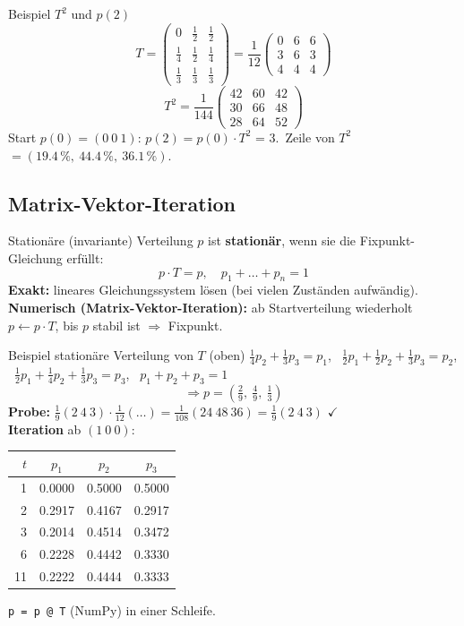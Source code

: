 \documentclass[a4paper, fontsize=7pt]{scrartcl}
\renewcommand*{\arraystretch}{1.5}  %
\begin{document}
\begin{subbox}{Beispiel $T^2$ und $p(2)$}
\renewcommand*{\arraystretch}{1.05}
$$T = \begin{pmatrix} 0 & \frac{1}{2} & \frac{1}{2}\\[2pt]
\frac{1}{4} & \frac{1}{2} & \frac{1}{4}\\[2pt]
\frac{1}{3} & \frac{1}{3} & \frac{1}{3} \end{pmatrix}
= \frac{1}{12} \begin{pmatrix} 0 & 6 & 6\\ 3 & 6 & 3\\ 4 & 4 & 4 \end{pmatrix}$$
$$T^2 = \frac{1}{144} \begin{pmatrix} 42 & 60 & 42\\ 30 & 66 & 48\\ 28 & 64 & 52
\end{pmatrix}$$
Start $p(0) = (0\ 0\ 1)$: $p(2) = p(0) \cdot T^2$ = 3.\ Zeile von $T^2$
$= (19.4\,\%,\ 44.4\,\%,\ 36.1\,\%)$.
\end{subbox}

\subsection{Matrix-Vektor-Iteration}

\begin{mainbox}{Stationäre (invariante) Verteilung}
$p$ ist \textbf{stationär}, wenn sie die Fixpunkt-Gleichung erfüllt:
$$\boxed{p \cdot T = p, \quad p_1 + \ldots + p_n = 1}$$
\textbf{Exakt:} lineares Gleichungssystem lösen (bei vielen Zuständen aufwändig).\\
\textbf{Numerisch (Matrix-Vektor-Iteration):} ab Startverteilung wiederholt
$p \leftarrow p \cdot T$, bis $p$ stabil ist $\Rightarrow$ Fixpunkt.
\end{mainbox}

\begin{subbox}{Beispiel stationäre Verteilung von $T$ (oben)}
$\frac{1}{4} p_2 + \frac{1}{3} p_3 = p_1$, \
$\frac{1}{2} p_1 + \frac{1}{2} p_2 + \frac{1}{3} p_3 = p_2$, \
$\frac{1}{2} p_1 + \frac{1}{4} p_2 + \frac{1}{3} p_3 = p_3$, \
$p_1 + p_2 + p_3 = 1$
$$\Rightarrow p = \left(\tfrac{2}{9},\ \tfrac{4}{9},\ \tfrac{1}{3}\right)$$
\textbf{Probe:}
$\frac{1}{9}(2\ 4\ 3) \cdot \frac{1}{12}(\ldots) = \frac{1}{108}(24\ 48\ 36)
= \frac{1}{9}(2\ 4\ 3)$ $\checkmark$\\[2pt]
\textbf{Iteration} ab $(1\ 0\ 0)$:
\begin{center}
\renewcommand*{\arraystretch}{1.05}
\begin{tabular}{r|ccc}
$t$ & $p_1$ & $p_2$ & $p_3$ \\ \hline
1 & 0.0000 & 0.5000 & 0.5000 \\
2 & 0.2917 & 0.4167 & 0.2917 \\
3 & 0.2014 & 0.4514 & 0.3472 \\
6 & 0.2228 & 0.4442 & 0.3330 \\
11 & 0.2222 & 0.4444 & 0.3333
\end{tabular}
\end{center}
\texttt{p = p @ T} (NumPy) in einer Schleife.
\end{subbox}
\end{document}
